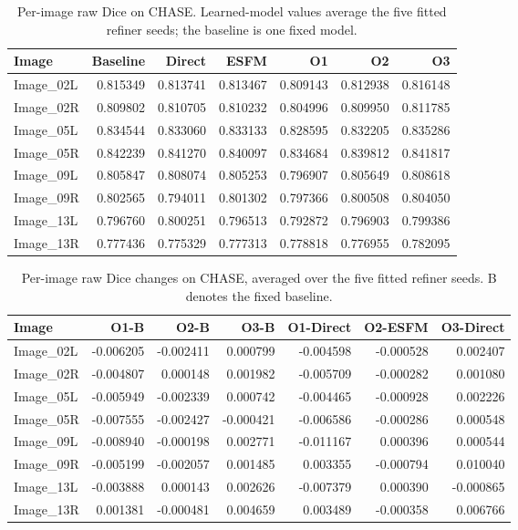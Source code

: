 \begin{table}[p]
\caption{Per-image raw Dice on CHASE. Learned-model values average the five fitted refiner seeds; the baseline is one fixed model.}\label{tab:completion-chase-image-means}
\centering\small\setlength{\tabcolsep}{4pt}
\begin{tabular}{lrrrrrr}
\toprule
Image & Baseline & Direct & ESFM & O1 & O2 & O3 \\
\midrule
Image\_02L & 0.815349 & 0.813741 & 0.813467 & 0.809143 & 0.812938 & 0.816148 \\
Image\_02R & 0.809802 & 0.810705 & 0.810232 & 0.804996 & 0.809950 & 0.811785 \\
Image\_05L & 0.834544 & 0.833060 & 0.833133 & 0.828595 & 0.832205 & 0.835286 \\
Image\_05R & 0.842239 & 0.841270 & 0.840097 & 0.834684 & 0.839812 & 0.841817 \\
Image\_09L & 0.805847 & 0.808074 & 0.805253 & 0.796907 & 0.805649 & 0.808618 \\
Image\_09R & 0.802565 & 0.794011 & 0.801302 & 0.797366 & 0.800508 & 0.804050 \\
Image\_13L & 0.796760 & 0.800251 & 0.796513 & 0.792872 & 0.796903 & 0.799386 \\
Image\_13R & 0.777436 & 0.775329 & 0.777313 & 0.778818 & 0.776955 & 0.782095 \\
\bottomrule
\end{tabular}
\end{table}

\begin{table}[p]
\caption{Per-image raw Dice changes on CHASE, averaged over the five fitted refiner seeds. B denotes the fixed baseline.}\label{tab:completion-chase-image-differences}
\centering\small\setlength{\tabcolsep}{4pt}
\begin{tabular}{lrrrrrr}
\toprule
Image & O1-B & O2-B & O3-B & O1-Direct & O2-ESFM & O3-Direct \\
\midrule
Image\_02L & -0.006205 & -0.002411 & 0.000799 & -0.004598 & -0.000528 & 0.002407 \\
Image\_02R & -0.004807 & 0.000148 & 0.001982 & -0.005709 & -0.000282 & 0.001080 \\
Image\_05L & -0.005949 & -0.002339 & 0.000742 & -0.004465 & -0.000928 & 0.002226 \\
Image\_05R & -0.007555 & -0.002427 & -0.000421 & -0.006586 & -0.000286 & 0.000548 \\
Image\_09L & -0.008940 & -0.000198 & 0.002771 & -0.011167 & 0.000396 & 0.000544 \\
Image\_09R & -0.005199 & -0.002057 & 0.001485 & 0.003355 & -0.000794 & 0.010040 \\
Image\_13L & -0.003888 & 0.000143 & 0.002626 & -0.007379 & 0.000390 & -0.000865 \\
Image\_13R & 0.001381 & -0.000481 & 0.004659 & 0.003489 & -0.000358 & 0.006766 \\
\bottomrule
\end{tabular}
\end{table}


